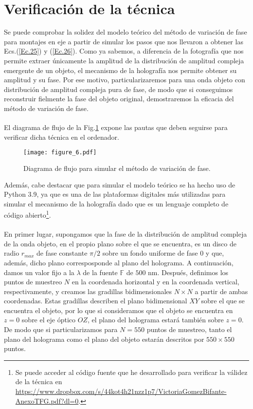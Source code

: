 \documentclass[12pt]{article}
\begin{document}
\section{Verificación de la técnica}
Se puede comprobar la solidez del modelo teórico del método de variación de fase para montajes en eje a partir de simular los pasos que nos llevaron a obtener las Ecs.(\ref{Ec.25}) y (\ref{Ec.26}). Como ya sabemos, a diferencia de la fotografía que nos permite extraer únicamente la  amplitud de la distribución de amplitud compleja emergente de un objeto, el mecanismo de la holografía nos permite obtener su amplitud y su fase. Por ese motivo,  particularizaremos para  una onda objeto con distribución de amplitud compleja pura de fase, de modo que si  conseguimos reconstruir fielmente la fase del objeto original, demostraremos  la eficacia del método de variación de fase. \\ \\
El diagrama de flujo de la Fig.\ref{figura6} expone las pautas que deben seguirse para verificar dicha técnica en el ordenador.
\begin{figure}[tbh!]
    \centering
    \texttt{[image: figure\_6.pdf]}
    \caption{Diagrama de flujo para simular el método de variación de fase.}
    \label{figura6}
\end{figure}
Además, cabe destacar que para simular el modelo teórico  se ha hecho uso de Python 3.9, ya que es una de las plataformas digitales más utilizadas para simular el mecanismo de la holografía dado que es un lenguaje completo de código abierto\footnote{Se puede acceder al código fuente que he desarrollado para verificar la válidez de la técnica en \textcolor{blue}{\url{https://www.dropbox.com/s/44kot4h21nzz1p7/VictoriaGomezBifante-AnexoTFG.pdf?dl=0}}.}.  \\ \\ 
En primer lugar, supongamos que la fase de la distribución de amplitud compleja de  la onda objeto, en el propio plano sobre el que se encuentra, es un disco de radio  $r_{max}$ de fase constante $\pi /2$ sobre un fondo uniforme de fase $0$ y que, además, dicho plano corresposponde al plano del holograma. A continuación, damos un valor fijo a la $\lambda$ de la fuente $\mathbb{F}$ de $500$ nm. Después, definimos los puntos de muestreo $N$  en la coordenada horizontal y en la coordenada vertical, respectivamente,  y creamos las gradillas bidimensionales  $N \times N$ a partir de ambas coordenadas. Estas gradillas describen el plano bidimensional $XY$  sobre el que se encuentra el objeto, por lo que si consideramos que el objeto se encuentra en $z = 0$ sobre el eje óptico $OZ$, el plano del holograma estará también sobre $z=0$. De modo que si particularizamos para $N = 550$ puntos de muestreo, tanto el plano del holograma como el plano del objeto estarán descritos por $550 \times 550$ puntos. \\ 
\end{document}
